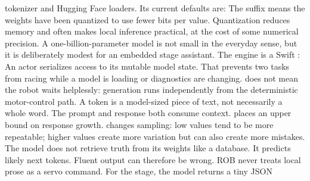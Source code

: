 {}tokenizer and Hugging Face loaders. Its current defaults are:\markdownRendererInterblockSeparator
{}\markdownRendererInterblockSeparator
{}The suffix  means the weights have been quantized to use fewer bits per\markdownRendererSoftLineBreak
{}value. Quantization reduces memory and often makes local inference practical,\markdownRendererSoftLineBreak
{}at the cost of some numerical precision. A one-billion-parameter model is not\markdownRendererSoftLineBreak
{}small in the everyday sense, but it is deliberately modest for an embedded\markdownRendererSoftLineBreak
{}stage assistant.\markdownRendererParagraphSeparator
{}The engine is a Swift :\markdownRendererInterblockSeparator
{}\markdownRendererInterblockSeparator
{}An actor serializes access to its mutable model state. That prevents two tasks\markdownRendererSoftLineBreak
{}from racing while a model is loading or diagnostics are changing. \markdownRendererSoftLineBreak
{}does not mean the robot waits helplessly: generation runs independently from\markdownRendererSoftLineBreak
{}the deterministic motor-control path.\markdownRendererInterblockSeparator
{}
\markdownRendererSectionEnd \markdownRendererSectionBegin
{}\markdownRendererInterblockSeparator
{}A token is a model-sized piece of text, not necessarily a whole word. The\markdownRendererSoftLineBreak
{}prompt and response both consume context.  places an upper bound on\markdownRendererSoftLineBreak
{}response growth.  changes sampling: low values tend to be more\markdownRendererSoftLineBreak
{}repeatable; higher values create more variation but can also create more\markdownRendererSoftLineBreak
{}mistakes.\markdownRendererParagraphSeparator
{}The model does not retrieve truth from its weights like a database. It predicts\markdownRendererSoftLineBreak
{}likely next tokens. Fluent output can therefore be wrong. ROB never treats\markdownRendererSoftLineBreak
{}local prose as a servo command. For the stage, the model returns a tiny JSON\markdownRendererSoftLineBreak
